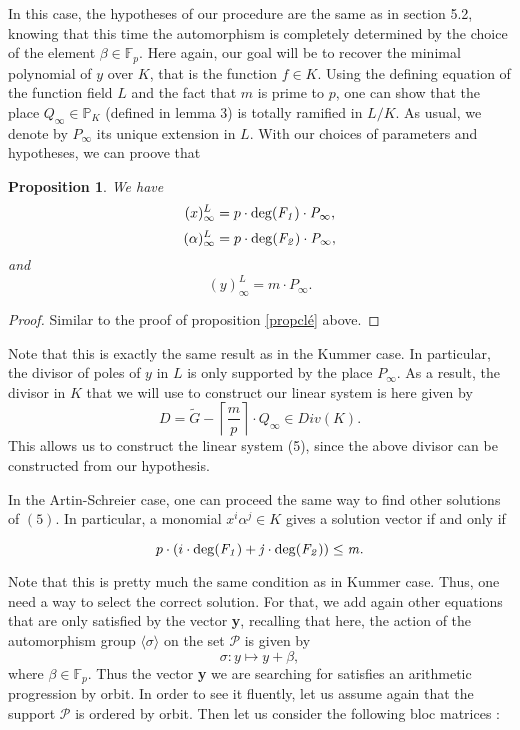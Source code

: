 \documentclass[10pt]{article}
\newtheorem{prop1}{Proposition}[]
\newcommand{\s}{\vspace{0.3cm}}
\newcommand{\cd}{\cdot}
\newcommand{\PR}{\mathcal{P}}
\begin{document}
\s

In this case, the hypotheses of our procedure are the same as in section 5.2, knowing that this time the automorphism is completely determined by the choice of the element $\beta \in \mathbb{F}_p$. Here again, our goal will be to recover the minimal polynomial of $y$ over $K$, that is the function $f \in K$. Using the defining equation of the function field $L$ and the fact that $m$ is prime to $p$, one can show that the place $Q_{\infty} \in \mathbb{P}_K$ (defined in lemma 3) is totally ramified in $L/K$. As usual, we denote by $P_{\infty}$ its unique extension in $L$. With our choices of parameters and hypotheses, we can proove that

\s

\begin{prop1} \label{propclé2}
We have
\[(x)^L_{\infty} = p \cd \rm{deg}\it(F_1) \cd P_{\infty},\]
\[(\alpha)^L_{\infty} = p \cd \rm{deg}\it(F_2) \cd P_{\infty},\]
and
\[(y)^L_{\infty} = m \cd P_{\infty}.\]
\end{prop1}

\s

\begin{proof}
Similar to the proof of proposition \ref{propclé} above.
\end{proof}

\s

Note that this is exactly the same result as in the Kummer case. In particular, the divisor of poles of $y$ in $L$ is only supported by the place $P_{\infty}$. As a result, the divisor in $K$ that we will use to construct our linear system is here given by 
\[D = \tilde{G} - \left\lceil\frac{m}{p}\right\rceil \cd Q_{\infty} \in Div(K).\]
This allows us to construct the linear system (5), since the above divisor can be constructed from our hypothesis. 

\s

In the Artin-Schreier case, one can proceed the same way to find other solutions of $(5)$. In particular, a monomial $x^i\alpha^j \in K$ gives a solution vector if and only if 

\[p \cd (i \cd \rm{deg}\it(F_1)+j \cd \rm{deg}\it(F_2)) \leq m.\]

Note that this is pretty much the same condition as in Kummer case. Thus, one need a way to select the correct solution. For that, we add again other equations that are only satisfied by the vector \textbf{y}, recalling that here, the action of the automorphism group $\langle\sigma\rangle$ on the set $\PR$ is given by 
\[\sigma : y \longmapsto y + \beta,\]
where $\beta \in \mathbb{F}_p$. Thus the vector \textbf{y} we are searching for satisfies an arithmetic progression by orbit. In order to see it fluently, let us assume again that the support $\PR$ is ordered by orbit. Then let us consider the following bloc matrices :
\end{document}
